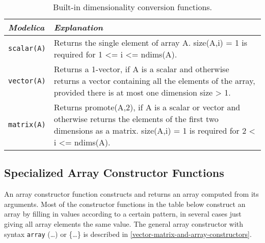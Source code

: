 \begin{longtable}[]{|l|p{9cm}|}
\caption{Built-in dimensionality conversion functions.}\\
\hline
\emph{Modelica} & \emph{Explanation}\\ \hline
\endhead
\lstinline!scalar(A)! & Returns the single element of array A. size(A,i) = 1 is required for 1
\textless{}= i \textless{}= ndims(A).\\ \hline
\lstinline!vector(A)!
&
Returns a 1-vector, if A is a scalar and otherwise returns a vector
containing all the elements of the array, provided there is at most one
dimension size \textgreater{} 1.\\ \hline
\lstinline!matrix(A)!
&
Returns promote(A,2), if A is a scalar or vector and otherwise returns
the elements of the first two dimensions as a matrix. size(A,i) = 1 is
required for 2 \textless{} i \textless{}= ndims(A).\\ \hline
\end{longtable}

\subsection{Specialized Array Constructor Functions}

An array constructor function constructs and returns an array computed
from its arguments. Most of the constructor functions in the table below
construct an array by filling in values according to a certain pattern,
in several cases just giving all array elements the same value. The
general array constructor with syntax \lstinline!array! (\ldots{}) or \{\ldots{}\}
is described in \autoref{vector-matrix-and-array-constructors}.

